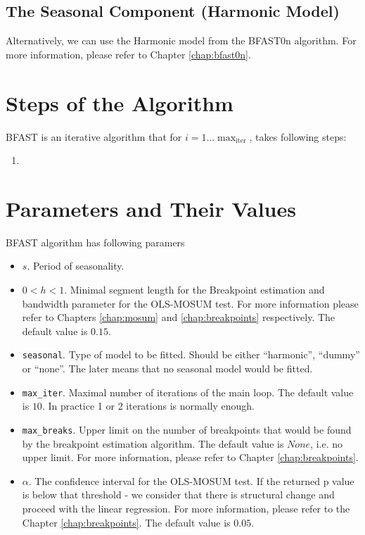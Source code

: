 \documentclass[main.tex]{subfiles}
\begin{document}
\subsection{The Seasonal Component (Harmonic Model)}
\label{subsec:seasonal_harm}
Alternatively, we can use the Harmonic model from the BFAST0n algorithm. For
more information, please refer to Chapter \ref{chap:bfast0n}.



\section{Steps of the Algorithm}
\label{sec:bfast_algorithm_steps}
BFAST is an iterative algorithm that for $i = 1 \hdots \operatorname{max}_\text{iter}$,
takes following steps:
\begin{enumerate}
\item 
\end{enumerate}

\section{Parameters and Their Values}
\label{sec:bfast_params}
BFAST algorithm has following paramers
\begin{itemize}
\item $s$. Period of seasonality.
\item $0<h<1$. Minimal segment length for the Breakpoint estimation and
  bandwidth parameter for the OLS-MOSUM test. For more information please refer
  to Chapters \ref{chap:mosum} and \ref{chap:breakpoints} respectively.
  The default value is $0.15$.
\item \texttt{seasonal}. Type of model to be fitted. Should be either
  ``harmonic'', ``dummy'' or ``none''. The later means that no seasonal model
  would be fitted.
\item \texttt{max\_iter}. Maximal number of iterations of the main loop. The
  default value is $10$. In practice 1 or 2 iterations is normally enough.
\item \texttt{max\_breaks}. Upper limit on the number of breakpoints that would be found by
  the breakpoint estimation algorithm. The default value is $None$, i.e. no upper limit.
  For more information, please refer to Chapter \ref{chap:breakpoints}.
\item $\alpha$. The confidence interval for the OLS-MOSUM test. If the returned
  p value is below that threshold - we consider that there is structural change
  and proceed with the linear regression. For more information, please refer to
  the Chapter \ref{chap:breakpoints}. The default value is $0.05$. 
\end{itemize}

\biblio
\end{document}
